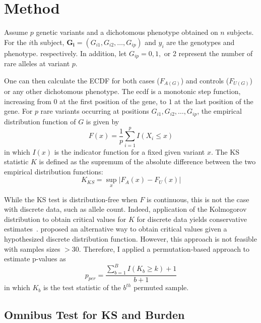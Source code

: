 \section{Method}
\label{sec:method}

Assume $p$ genetic variants and a dichotomous phenotype obtained on $n$ subjects.
For the $i$th subject,   $\bm{G_i} = (G_{i1}, G_{i2},\ldots , G_{ip})$ and $y_i$ are the genotypes and phenotype. respectively.
In addition, let $G_{ip} = 0, 1,$ or 2 represent the number of rare alleles at variant $p$.  

One can then calculate the \acrfull{ECDF} for both cases ($F_{A(G)}$) and controls ($F_{U(G)}$) or any other dichotomous phenotype.
The ecdf is a monotonic step function, increasing from $0$ at the first position of the gene, to $1$ at the last position of the gene.
For $p$ rare variants occurring at positions  $G_{i1}, G_{i2}, \ldots, G_{ip}$, the empirical distribution function of $G$ is given by
\begin{equation}
  F(x) = \frac{1}{p}\sum^p_{i=1}I(X_i \leq x)
\end{equation}
in which $I(x)$ is the indicator function for a fixed given variant $x$.
The KS statistic $K$ is defined as the supremum of the absolute difference between the two empirical distribution functions:
\begin{equation}
	K_{KS} = \sup_x | F_A(x) - F_U(x) |
\end{equation}

While the KS test is distribution-free when $F$ is continuous, this is not the case with discrete data, such as allele count.
Indeed, application of the Kolmogorov distribution to obtain critical values for $K$ for discrete data yields conservative estimates~\cite{Walsh1963,Conover1972}. 
\citet{Conover1972} proposed an alternative way to obtain critical values given a hypothesized discrete distribution function.
However, this approach is not feasible with samples sizes $>30$.
Therefore, I applied a permutation-based approach to estimate p-values as 
\begin{equation}
  p_{per} = \frac{\sum^B_{b=1} I(K_b \geq k)+1}{b+1}
\end{equation}
in which $K_b$ is the test statistic of the $b^{th}$ permuted sample.

\subsection{Omnibus Test for KS and Burden}
\label{sub:omnibus_test_for_ks_and_burden}


